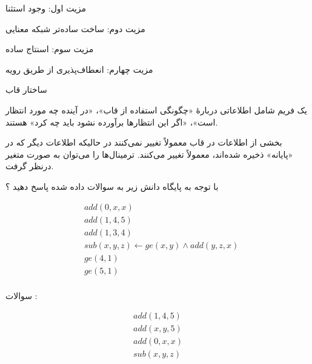 \documentclass[12pt]{article}
\begin{document}
\begin{tcolorbox}
مزیت اول: وجود استثنا

مزیت دوم: ساخت ساده‌تر شبکه معنایی

مزیت سوم: اسنتاج ساده

مزیت چهارم: انعطاف‌پذیری از طریق رویه
\end{tcolorbox}



\begin{tcolorbox}
ساختار قاب

یک فریم شامل اطلاعاتی دربارهٔ «چگونگی استفاده از قاب»، «در آینده چه مورد انتظار است»، «اگر این انتظارها برآورده نشود باید چه کرد» هستند.

بخشی از اطلاعات در قاب معمولاً تغییر نمی‌کنند در حالیکه اطلاعات دیگر که در «پایانه» 
 ذخیره شده‌اند، معمولاً تغییر می‌کنند. ترمینال‌ها را می‌توان به صورت متغیر درنظر گرفت.
\end{tcolorbox}


\vspace{30pt}



\noindent
با توجه به پایگاه دانش زیر به سوالات داده شده پاسخ دهید ؟





\begin{latin}
\begin{align*}
&add(0,x,x) \\
&add(1,4,5) \\
&add(1,3,4) \\
&sub(x,y,z) \leftarrow ge(x,y) \land add(y,z,x) \\
&ge(4,1) \\
&ge(5,1) \\
\end{align*}
\end{latin}


\noindent
سوالات :


\begin{latin}
\begin{align*}
add(1,4,5) \\
add(x,y,5) \\
add(0,x,x) \\
sub(x,y,z) \\
\end{align*}
\end{latin}
\end{document}
